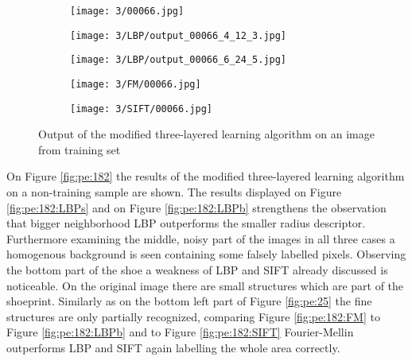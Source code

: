 \documentclass[draft,final]{vutinfth} %
\begin{document}
\begin{figure}[h]
  \centering
  \begin{subfigure}[b]{0.19\columnwidth}
    \centering
    \texttt{[image: 3/00066.jpg]}
    \label{fig:pe:66:orig}
  \end{subfigure}
  \begin{subfigure}[b]{0.19\columnwidth}
    \centering
    \texttt{[image: 3/LBP/output\_00066\_4\_12\_3.jpg]}
    \label{fig:pe:66:LBPs}
  \end{subfigure}
  \begin{subfigure}[b]{0.19\columnwidth}
    \centering
    \texttt{[image: 3/LBP/output\_00066\_6\_24\_5.jpg]}
    \label{fig:pe:66:LBPb}
  \end{subfigure}
  \begin{subfigure}[b]{0.19\columnwidth}
    \centering
    \texttt{[image: 3/FM/00066.jpg]}
    \label{fig:pe:66:FM}
  \end{subfigure}
  \begin{subfigure}[b]{0.19\columnwidth}
    \centering
    \texttt{[image: 3/SIFT/00066.jpg]}
    \label{fig:pe:66:SIFT}
  \end{subfigure}
  \caption{Output of the modified three-layered learning algorithm on an image from training set}
  \label{fig:pe:66}
\end{figure}

\par
On Figure \ref{fig:pe:182} the results of the modified three-layered learning algorithm on a non-training sample are shown.
The results displayed on Figure \ref{fig:pe:182:LBPs} and on Figure \ref{fig:pe:182:LBPb} strengthens the observation that bigger neighborhood LBP outperforms the smaller radius descriptor.
Furthermore examining the middle, noisy part of the images in all three cases a homogenous background is seen containing some falsely labelled pixels.
Observing the bottom part of the shoe a weakness of LBP and SIFT already discussed is noticeable.
On the original image there are small structures which are part of the shoeprint.
Similarly as on the bottom left part of Figure \ref{fig:pe:25} the fine structures are only partially recognized, comparing Figure \ref{fig:pe:182:FM} to Figure \ref{fig:pe:182:LBPb} and to Figure \ref{fig:pe:182:SIFT} Fourier-Mellin outperforms LBP and SIFT again labelling the whole area correctly.
\end{document}
